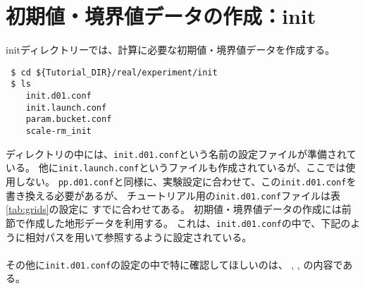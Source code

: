 \section{初期値・境界値データの作成：init} \label{sec:tutrial_real_init}

initディレクトリーでは、\scalerm 計算に必要な初期値・境界値データを作成する。
\begin{verbatim}
 $ cd ${Tutorial_DIR}/real/experiment/init
 $ ls
    init.d01.conf
    init.launch.conf
    param.bucket.conf
    scale-rm_init
\end{verbatim}
ディレクトリの中には、\verb|init.d01.conf|という名前の設定ファイルが準備されている。
他に\verb|init.launch.conf|というファイルも作成されているが、ここでは使用しない。
\verb|pp.d01.conf|と同様に、実験設定に合わせて、この\verb|init.d01.conf|を書き換える必要があるが、
チュートリアル用の\verb|init.d01.conf|ファイルは表\ref{tab:grids}の設定に
すでに合わせてある。
初期値・境界値データの作成には前節で作成した地形データを利用する。
これは、\verb|init.d01.conf|の中で、下記のように相対パスを用いて参照するように設定されている。\\

\\

\noindent その他に\verb|init.d01.conf|の設定の中で特に確認してほしいのは、
,
, の内容である。\\

